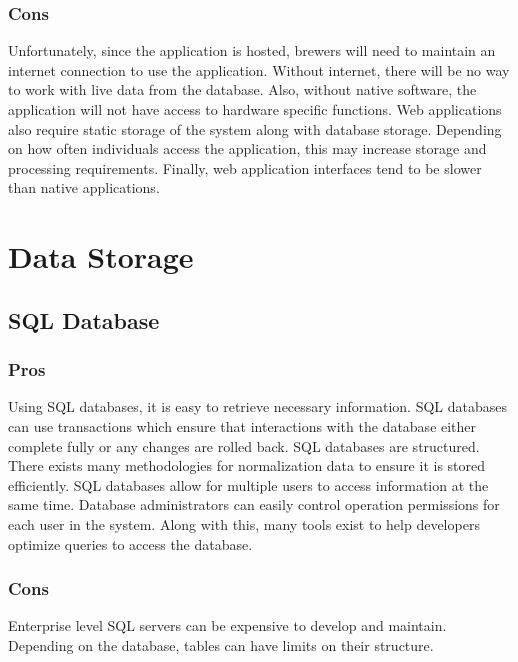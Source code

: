 \documentclass[draftclsnofoot,onecolumn,letterpaper,10pt,compsoc]{IEEEtran}
\begin{document}
        \subsubsection{Cons}
            Unfortunately, since the application is hosted, brewers will need to maintain an internet connection to use the application.
            Without internet, there will be no way to work with live data from the database.
            Also, without native software, the application will not have access to hardware specific functions.
            Web applications also require static storage of the system along with database storage.
            Depending on how often individuals access the application, this may increase storage and processing requirements.
            Finally, web application interfaces tend to be slower than native applications\cite{LifeWireOverview}.


\section{Data Storage}
	\subsection{SQL Database}
        \subsubsection{Pros}
            Using SQL databases, it is easy to retrieve necessary information.
            SQL databases can use transactions which ensure that interactions with the database either complete fully or any changes are rolled back.
            SQL databases are structured.
            There exists many methodologies for normalization data to ensure it is stored efficiently\cite{TechwallaSQL}.
            SQL databases allow for multiple users to access information at the same time\cite{TechwallaSQLPros}.
            Database administrators can easily control operation permissions for each user in the system.
            Along with this, many tools exist to help developers optimize queries to access the database.
    
        \subsubsection{Cons}
            Enterprise level SQL servers can be expensive to develop and maintain.
            Depending on the database, tables can have limits on their structure\cite{TechwallaSQLCons}.
\end{document}
